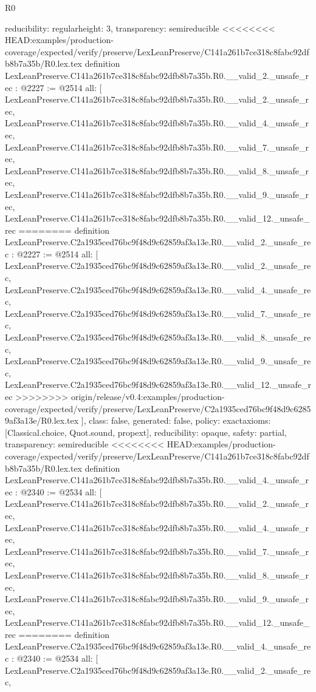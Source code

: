 \begin{lexlean}{R0}
\begin{coremodule}
{{{{{{{{{{{{{{{{{{{{{{{{{{{{{{{{{{{{{{{{{{{{{{{{{{  reducibility: regular{height: 3},
  transparency: semireducible
}
<<<<<<<< HEAD:examples/production-coverage/expected/verify/preserve/LexLeanPreserve/C141a261b7ce318c8fabc92dfb8b7a35b/R0.lex.tex
definition LexLeanPreserve.C141a261b7ce318c8fabc92dfb8b7a35b.R0.__valid_2._unsafe_rec : @2227 := @2514 {
  all: [
    LexLeanPreserve.C141a261b7ce318c8fabc92dfb8b7a35b.R0.__valid_2._unsafe_rec,
    LexLeanPreserve.C141a261b7ce318c8fabc92dfb8b7a35b.R0.__valid_4._unsafe_rec,
    LexLeanPreserve.C141a261b7ce318c8fabc92dfb8b7a35b.R0.__valid_7._unsafe_rec,
    LexLeanPreserve.C141a261b7ce318c8fabc92dfb8b7a35b.R0.__valid_8._unsafe_rec,
    LexLeanPreserve.C141a261b7ce318c8fabc92dfb8b7a35b.R0.__valid_9._unsafe_rec,
    LexLeanPreserve.C141a261b7ce318c8fabc92dfb8b7a35b.R0.__valid_12._unsafe_rec
========
definition LexLeanPreserve.C2a1935ced76bc9f48d9c62859af3a13e.R0.__valid_2._unsafe_rec : @2227 := @2514 {
  all: [
    LexLeanPreserve.C2a1935ced76bc9f48d9c62859af3a13e.R0.__valid_2._unsafe_rec,
    LexLeanPreserve.C2a1935ced76bc9f48d9c62859af3a13e.R0.__valid_4._unsafe_rec,
    LexLeanPreserve.C2a1935ced76bc9f48d9c62859af3a13e.R0.__valid_7._unsafe_rec,
    LexLeanPreserve.C2a1935ced76bc9f48d9c62859af3a13e.R0.__valid_8._unsafe_rec,
    LexLeanPreserve.C2a1935ced76bc9f48d9c62859af3a13e.R0.__valid_9._unsafe_rec,
    LexLeanPreserve.C2a1935ced76bc9f48d9c62859af3a13e.R0.__valid_12._unsafe_rec
>>>>>>>> origin/release/v0.4:examples/production-coverage/expected/verify/preserve/LexLeanPreserve/C2a1935ced76bc9f48d9c62859af3a13e/R0.lex.tex
  ],
  class: false,
  generated: false,
  policy: exact{axioms: [Classical.choice, Quot.sound, propext]},
  reducibility: opaque{},
  safety: partial,
  transparency: semireducible
}
<<<<<<<< HEAD:examples/production-coverage/expected/verify/preserve/LexLeanPreserve/C141a261b7ce318c8fabc92dfb8b7a35b/R0.lex.tex
definition LexLeanPreserve.C141a261b7ce318c8fabc92dfb8b7a35b.R0.__valid_4._unsafe_rec : @2340 := @2534 {
  all: [
    LexLeanPreserve.C141a261b7ce318c8fabc92dfb8b7a35b.R0.__valid_2._unsafe_rec,
    LexLeanPreserve.C141a261b7ce318c8fabc92dfb8b7a35b.R0.__valid_4._unsafe_rec,
    LexLeanPreserve.C141a261b7ce318c8fabc92dfb8b7a35b.R0.__valid_7._unsafe_rec,
    LexLeanPreserve.C141a261b7ce318c8fabc92dfb8b7a35b.R0.__valid_8._unsafe_rec,
    LexLeanPreserve.C141a261b7ce318c8fabc92dfb8b7a35b.R0.__valid_9._unsafe_rec,
    LexLeanPreserve.C141a261b7ce318c8fabc92dfb8b7a35b.R0.__valid_12._unsafe_rec
========
definition LexLeanPreserve.C2a1935ced76bc9f48d9c62859af3a13e.R0.__valid_4._unsafe_rec : @2340 := @2534 {
  all: [
    LexLeanPreserve.C2a1935ced76bc9f48d9c62859af3a13e.R0.__valid_2._unsafe_rec,
}}}}}}}}}}}}}}}}}}}}}}}}}}}}}}}}}}}}}}}}}}}}}}}}}}}}
\end{coremodule}
\end{lexlean}
